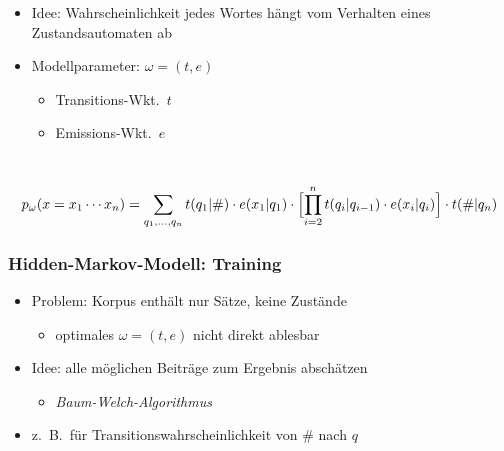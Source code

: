 \documentclass{beamer}
\begin{document}
\begin{frame}
\begin{columns}
  \begin{itemize}
   \item Idee: Wahrscheinlichkeit jedes Wortes hängt vom Verhalten eines Zustandsautomaten ab
   \pause\pause
   \item Modellparameter: $\omega=(t,e)$ %
    \begin{itemize}
     \item Transitions-Wkt.~$t$
     \item Emissions-Wkt.~$e$
    \end{itemize}
  \end{itemize}
 \end{columns}
 \scriptsize\vspace{1em}\[
  p_\omega(x=x_1\cdots x_n) = \sum_{q_1,\ldots,q_n} t(q_1|\#) \cdot e(x_1|q_1) \cdot \Bigl[\prod_{i=2}^n t(q_i|q_{i-1}) \cdot e(x_i|q_i)\Bigr] \cdot t(\#|q_n)
 \]
\end{frame}

\begin{frame}\frametitle{Hidden-Markov-Modell: Training}
 \begin{itemize}
  \item Problem: Korpus enthält nur Sätze, keine Zustände
   \begin{itemize}
    \item optimales $\omega = (t,e)$ nicht direkt ablesbar
   \end{itemize}
  \pause\item Idee: alle möglichen Beiträge zum Ergebnis abschätzen
   \begin{itemize}
    \item \emph{Baum-Welch-Algorithmus}
   \end{itemize}
  \pause\item z.~B.~für Transitionswahrscheinlichkeit von $\#$ nach $q$
   \begin{center}\end{center}
 \end{itemize}
\end{frame}
\end{document}
